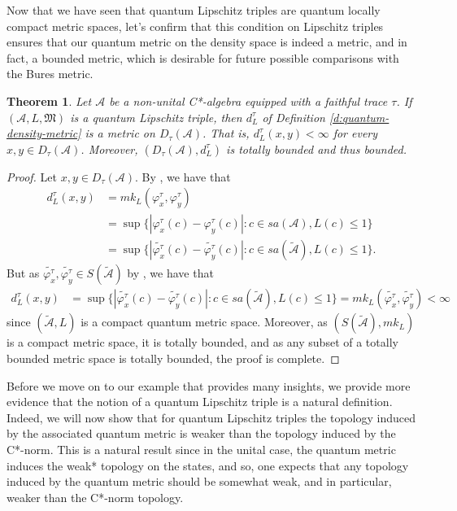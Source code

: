 \documentclass{amsart}
\theoremstyle{plain}
\newtheorem{theorem}{Theorem}[section]
\theoremstyle{definition}
\theoremstyle{remark}
\numberwithin{equation}{section}
\newcommand{\A}{{\mathcal{A}}}
\newcommand{\wt}[1]{{\widetilde{#1}}}
\newcommand{\M}{{\mathfrak{M}}}
\renewcommand{\leq}{\leqslant}
\begin{document}
Now that we have seen that quantum Lipschitz triples are quantum locally compact metric spaces, let's confirm that this condition on Lipschitz triples ensures that our quantum metric on the density space is indeed a metric, and in fact, a  bounded metric, which is desirable for future possible  comparisons with the Bures metric.
\begin{theorem}\label{t:qlt-metric}
     Let $\A$ be a non-unital C*-algebra equipped with a faithful trace $\tau$. If  $(\A, L,\M)$ is a quantum Lipschitz triple, then $d_L^\tau$ of Definition \ref{d:quantum-density-metric} is a metric on $D_\tau(\A)$. That is, $d_L^\tau(x,y)<\infty$ for every $x,y\in D_\tau(\A)$. Moreover, $(D_\tau(\A), d_L^\tau)$ is totally bounded and thus bounded.
\end{theorem}
\begin{proof}  Let $x,y\in D_\tau(\A)$. By \cite[Remark 2.9]{Latremoliere12b}, we have that 
    \begin{align*}
    d_L^\tau(x,y)&=mk_L(\varphi^\tau_x, \varphi^\tau_y)\\
    & = \sup \{ |\varphi^\tau_x(c)- \varphi^\tau_y(c)| : c\in sa(\A), L(c)\leq 1\}\\
    &= \sup \{ |\wt{\varphi^\tau_x}(c)- \wt{\varphi^\tau_y}(c)| : c\in sa(\wt{\A}), L(c)\leq 1\}.
\end{align*}
But as $\wt{\varphi^\tau_x}, \wt{\varphi^\tau_y}\in S(\wt{\A})$ by \cite[Proposition 2.1.5(vi)]{Dixmier-c-book}, we have that 
    \begin{align*}
    d_L^\tau(x,y)&=\sup \{ |\wt{\varphi^\tau_x}(c)- \wt{\varphi^\tau_y}(c)| : c\in sa(\wt{\A}), L(c)\leq 1\} 
     =mk_L(\wt{\varphi^\tau_x}, \wt{\varphi^\tau_y})<\infty
    \end{align*}
    since $(\wt{\A}, L)$ is a compact quantum metric space. Moreover, as $(S(\wt{\A}), mk_L)$ is a compact metric space, it is totally bounded, and as any subset of a totally bounded metric space is totally bounded, the proof is complete.
\end{proof}

Before we move on to our example that provides many insights, we provide more evidence that the notion of a quantum Lipschitz triple is a natural definition. Indeed, we will now show that for quantum Lipschitz triples the topology induced by the associated quantum metric is weaker than the topology induced by the C*-norm. This is a natural result since in the unital case, the quantum metric induces the weak* topology on the states, and so, one expects that any topology induced by the quantum metric should be somewhat weak, and in particular, weaker than the C*-norm topology.
\end{document}
